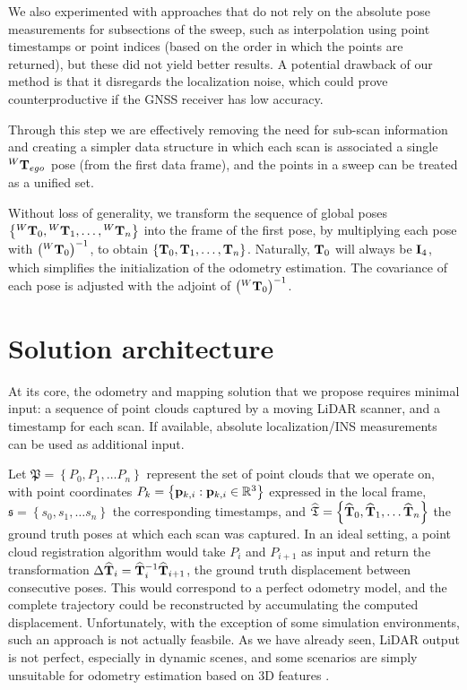 We also experimented with approaches that do not rely on the absolute pose measurements for subsections of the sweep, such as interpolation using point timestamps or point indices (based on the order in which the points are returned), but these did not yield better results. A potential drawback of our method is that it disregards the localization noise, which could prove counterproductive if the GNSS receiver has low accuracy.

Through this step we are effectively removing the need for sub-scan information and creating a simpler data structure in which each scan is associated a single ${}^W\mathbf{T}_{{ego}_{}}$ pose (from the first data frame), and the points in a sweep can be treated as a unified set.

Without loss of generality, we transform the sequence of global poses
$\left\{{}^W\mathbf{T}_{0}, {}^W\mathbf{T}_{1}, \dots, {}^W\mathbf{T}_{n}\right\}$
into the frame of the first pose, by multiplying each pose with  $\left({}^W\mathbf{T}_{0}\right)^{-1}$, to obtain $\left\{\mathbf{T}_0, \mathbf{T}_1, \dots, \mathbf{T}_n\right\}$. Naturally, $\mathbf{T}_0$ will always be $\mathbf{I}_4$, which simplifies the initialization of the odometry estimation. The covariance of each pose is adjusted  with the adjoint of $\left({}^W\mathbf{T}_{0}\right)^{-1}$.



\section{Solution architecture}

At its core, the odometry and mapping solution that we propose requires minimal input: a sequence of point clouds captured by a moving LiDAR scanner, and a timestamp for each scan. If available, absolute localization/INS measurements can be used as additional input.

Let $\mathfrak{P} = \left\{ P_0, P_1, \dots P_n\right\}$ represent the set of point clouds that we operate on, with point coordinates $P_k = \left\{\mathbf{p}_{k,i} : \mathbf{p}_{k,i} \in {\mathbb{R}}^3 \right\}$ expressed in the local frame, $\mathfrak{s} = \left\{ s_0, s_1, \dots s_n\right\}$ the corresponding timestamps, and $\widehat{\mathfrak{T}} = \left\{ \widehat{\mathbf{T}}_{0}, \widehat{\mathbf{T}}_{1}, \dots \widehat{\mathbf{T}}_{n} \right\}$ the ground truth poses at which each scan was captured. In an ideal setting, a point cloud registration algorithm would take $P_i$ and $P_{i+1}$ as input and return the transformation $\Delta\widehat{\mathbf{T}}_{i} = \widehat{\mathbf{T}}_{i}^{-1} \widehat{\mathbf{T}}_{i+1}$, \ie the ground truth displacement between consecutive poses. This would correspond to a perfect odometry model, and the complete trajectory could be reconstructed by accumulating the computed displacement. Unfortunately, with the exception of some simulation environments, such an approach is not actually feasbile. As we have already seen, LiDAR output is not perfect, especially in dynamic scenes, and some scenarios are simply unsuitable for odometry estimation based on 3D features \cite{lidartunnel}.

